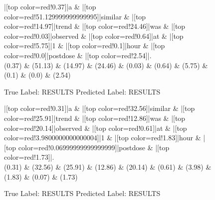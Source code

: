 \documentclass[a4paper, landscape]{article}
\begin{document}
\clearpage
\begin{figure}
\begin{center}
\begin{dependency}
\begin{deptext}
|[top color=red!0.37]|a \& |[top color=red!51.129999999999995]|similar \& |[top color=red!14.97]|trend \& |[top color=red!24.46]|was \& |[top color=red!0.03]|observed \& |[top color=red!0.64]|at \& |[top color=red!5.75]|1 \& |[top color=red!0.1]|hour \& |[top color=red!0.0]|postdose \& |[top color=red!2.54]|.\\
(0.37) \& (51.13) \& (14.97) \& (24.46) \& (0.03) \& (0.64) \& (5.75) \& (0.1) \& (0.0) \& (2.54)\\
\end{deptext}
\end{dependency}
\end{center}
\caption{True Label: RESULTS Predicted Label: RESULTS}
\end{figure}
\clearpage
\begin{figure}
\begin{center}
\begin{dependency}
\begin{deptext}
|[top color=red!0.31]|a \& |[top color=red!32.56]|similar \& |[top color=red!25.91]|trend \& |[top color=red!12.86]|was \& |[top color=red!20.14]|observed \& |[top color=red!0.61]|at \& |[top color=red!3.9800000000000004]|1 \& |[top color=red!1.83]|hour \& |[top color=red!0.06999999999999999]|postdose \& |[top color=red!1.73]|.\\
(0.31) \& (32.56) \& (25.91) \& (12.86) \& (20.14) \& (0.61) \& (3.98) \& (1.83) \& (0.07) \& (1.73)\\
\end{deptext}
\end{dependency}
\end{center}
\caption{True Label: RESULTS Predicted Label: RESULTS}
\end{figure}
\end{document}
